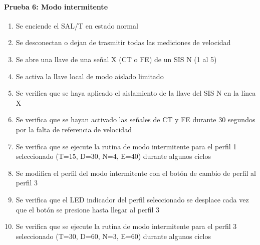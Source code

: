 \paragraph{Prueba 6: Modo intermitente}
\begin{enumerate}
\item	Se enciende el SAL/T en estado normal
\item	Se desconectan o dejan de trasmitir todas las mediciones de velocidad
\item	Se abre una llave de una señal X (CT o FE) de un SIS N (1 al 5)
\item	Se activa la llave local de modo aislado limitado
\item	Se verifica que se haya aplicado el aislamiento de la llave del SIS N en la línea X
\item	Se verifica que se hayan activado las señales de CT y FE  durante 30 segundos por la falta de referencia de velocidad
\item	Se verifica que se ejecute la rutina de modo intermitente para el perfil 1 seleccionado (T=15, D=30, N=4, E=40) durante algunos ciclos
\item	Se modifica el perfil del modo intermitente con el botón de cambio de perfil al perfil 3
\item	Se verifica que el LED indicador del perfil seleccionado se desplace cada vez que el botón se presione hasta llegar al perfil 3
\item	Se verifica que se ejecute la rutina de modo intermitente para el perfil 3 seleccionado (T=30, D=60, N=3, E=60) durante algunos ciclos

\end{enumerate}

